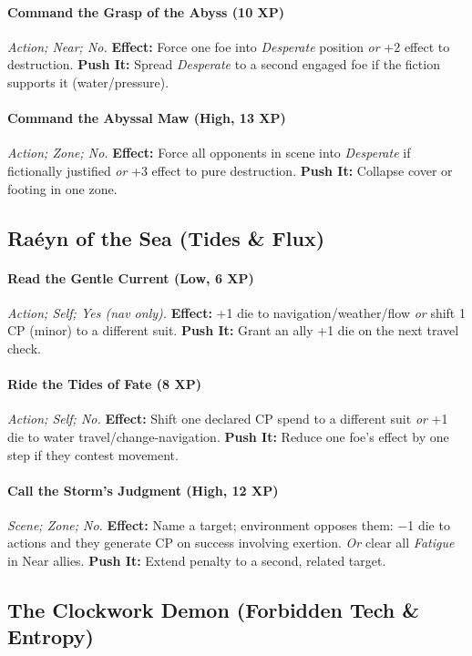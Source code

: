 \documentclass[12pt,twoside]{book}
\begin{document}
\paragraph{Command the Grasp of the Abyss (10 XP)} \emph{Action; Near; No.}
\textbf{Effect:} Force one foe into \emph{Desperate} position \emph{or} +2 effect to destruction.
\textbf{Push It:} Spread \emph{Desperate} to a second engaged foe if the fiction supports it (water/pressure).
\paragraph{Command the Abyssal Maw (High, 13 XP)} \emph{Action; Zone; No.}
\textbf{Effect:} Force all opponents in scene into \emph{Desperate} if fictionally justified \emph{or} +3 effect to pure destruction.
\textbf{Push It:} Collapse cover or footing in one zone.

\subsection{Raéyn of the Sea (Tides \& Flux)}
\paragraph{Read the Gentle Current (Low, 6 XP)} \emph{Action; Self; Yes (nav only).}
\textbf{Effect:} +1 die to navigation/weather/flow \emph{or} shift 1 CP (minor) to a different suit.
\textbf{Push It:} Grant an ally +1 die on the next travel check.
\paragraph{Ride the Tides of Fate (8 XP)} \emph{Action; Self; No.}
\textbf{Effect:} Shift one declared CP spend to a different suit \emph{or} +1 die to water travel/change-navigation.
\textbf{Push It:} Reduce one foe’s effect by one step if they contest movement.
\paragraph{Call the Storm's Judgment (High, 12 XP)} \emph{Scene; Zone; No.}
\textbf{Effect:} Name a target; environment opposes them: −1 die to actions and they generate CP on success involving exertion. \emph{Or} clear all \emph{Fatigue} in Near allies.
\textbf{Push It:} Extend penalty to a second, related target.

\subsection{The Clockwork Demon (Forbidden Tech \& Entropy)}
\end{document}
